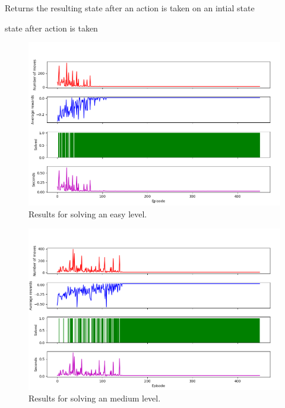\documentclass[times, 10pt,twocolumn]{article}
\begin{document}
\begin{algorithm}
  \caption{Returns the resulting state after an action is taken on an intial state}
  \begin{algorithmic}[6]
      \State \Return state after action is taken
    \EndFunction
  \end{algorithmic}
\end{algorithm}


\begin{figure}[h] 
  \centering
     \includegraphics[width=\linewidth]{images/easy_graph.png}
  \caption{Results for solving an easy level.}
  \label{fig:e}
\end{figure}

\begin{figure}[h] 
  \centering
     \includegraphics[width=\linewidth]{images/medium_graph.png}
  \caption{Results for solving an medium level.}
  \label{fig:m}
\end{figure}
\end{document}

